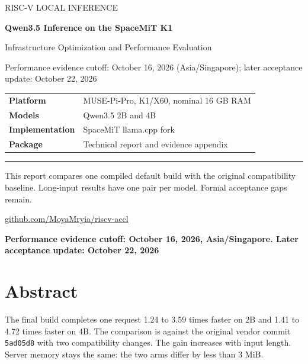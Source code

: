 \documentclass[10pt,a4paper]{article}
\begin{document}
\begin{titlepage}
\vspace*{15mm}
{\large\textcolor{reportblue}{RISC-V LOCAL INFERENCE}}\par
\vspace{12mm}
{\Huge\bfseries Qwen3.5 Inference on the SpaceMiT K1\par}
\vspace{8mm}
{\Large Infrastructure Optimization and Performance Evaluation\par}
\vspace{12mm}
{\large Performance evidence cutoff: October 16, 2026 (Asia/Singapore);
later acceptance update: October 22, 2026\par}
\vspace{14mm}
\begin{tabular}{@{}ll@{}}
\textbf{Platform} & MUSE-Pi-Pro, K1/X60, nominal 16 GB RAM \\
\textbf{Models} & Qwen3.5 2B and 4B \\
\textbf{Implementation} & SpaceMiT llama.cpp fork \\
\textbf{Package} & Technical report and evidence appendix \\
\end{tabular}
\vfill
\textcolor{reportblue}{\rule{\textwidth}{1pt}}\par
This report compares one compiled default build with the original compatibility baseline.
Long-input results have one pair per model. Formal acceptance gaps remain.\par
\vspace{6mm}
\href{https://github.com/MoyaMryia/riscv-accl}{github.com/MoyaMryia/riscv-accl}
\end{titlepage}
{\small\tableofcontents}
\clearpage
\textbf{Performance evidence cutoff: October 16, 2026, Asia/Singapore.
Later acceptance update: October 22, 2026}

\hypertarget{abstract}{%
\section{Abstract}\label{abstract}}

The final build completes one request 1.24 to 3.59 times faster on 2B
and 1.41 to 4.72 times faster on 4B. The comparison is against the
original vendor commit \nolinkurl{5ad05d8} with two compatibility
changes. The gain increases with input length. Server memory stays the
same: the two arms differ by less than 3 MiB.
\end{document}
